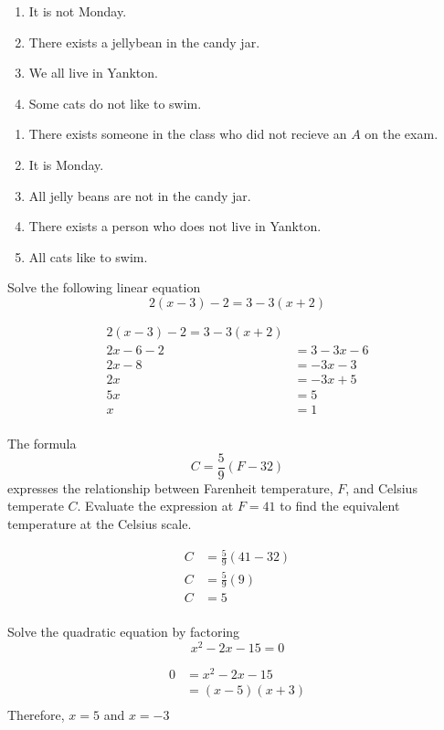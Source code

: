 \documentclass[addpoints,12pt]{exam}
\theoremstyle{definition}
\begin{document}
\begin{questions}
\begin{enumerate}[label = \alph*)]
	\item It is not Monday. 
	\item There exists a jellybean in the candy jar. 
	\item We all live in Yankton. 
	\item Some cats do not like to swim. 
\end{enumerate}
\begin{solution}
    \begin{enumerate}[label = \alph*)]
        \item There exists someone in the class who did not recieve an $A$ on the exam. 
				\item It is Monday. 
				\item All jelly beans are not in the candy jar. 
				\item There exists a person who does not live in Yankton. 
				\item All cats like to swim. 
    \end{enumerate}
\end{solution}
\question Solve the following linear equation 
\[
2(x-3)-2 = 3-3(x+2) 
\]
\begin{solution}
    \begin{align*}
        2(x-3)-2 = 3-3(x+2)\\
				2x-6 - 2 & = 3 -3x-6 \\
				2x-8 & = -3x-3 \\
				2x & = -3x +5 \\
				5x & = 5 \\
				x & = 1 \\
    \end{align*}
\end{solution}
\question The formula 
\[
C = \frac{5}{9}(F-32)
\]
expresses the relationship between Farenheit temperature, $F$, and Celsius temperate $C$. Evaluate the expression at $F = 41$ to find the equivalent temperature at the Celsius scale. 
\begin{solution}
	\begin{solution}
		\begin{align*}
			C &= \frac{5}{9}(41-32)\\
			C & = \frac{5}{9}(9) \\
			C & = 5 \\
		\end{align*}
	\end{solution}
\end{solution}
\question Solve the quadratic equation by factoring 
\[
x^{2}-2x-15 = 0 
\]
\begin{solution}
     \begin{align*}
			 0 & = x^{2}-2x-15 \\
			& = (x-5)(x+3)\\
     \end{align*} 
		 Therefore, $x=5$ and $x = -3$
\end{solution}


\end{questions}
\end{document}
